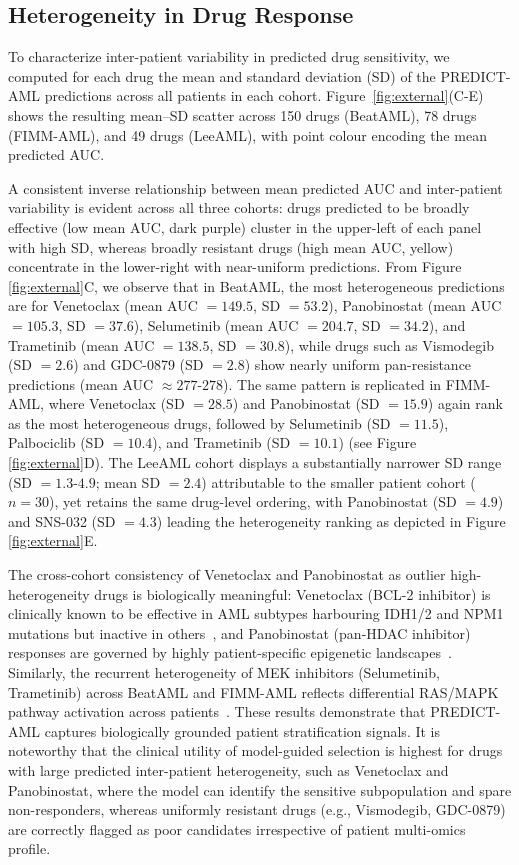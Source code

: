 \documentclass[pdflatex,sn-mathphys-num]{sn-jnl}
\theoremstyle{thmstyleone}
\theoremstyle{thmstyletwo}
\theoremstyle{thmstylethree}
\begin{document}
\subsection{Heterogeneity in Drug Response}\label{sec3.7}
To characterize inter-patient variability in predicted drug sensitivity, we computed for each drug the mean and standard deviation (SD) of the PREDICT-AML predictions across all patients in each cohort. Figure~\ref{fig:external}(C-E) shows the resulting mean–SD scatter across 150 drugs (BeatAML), 78 drugs (FIMM-AML), and 49 drugs (LeeAML), with point colour encoding the mean predicted AUC.

A consistent inverse relationship between mean predicted AUC and inter-patient variability is evident across all three cohorts: drugs predicted to be broadly effective (low mean AUC, dark purple) cluster in the upper-left of each panel with high SD, whereas broadly resistant drugs (high mean AUC, yellow) concentrate in the lower-right with near-uniform predictions. From Figure \ref{fig:external}C, we observe that in BeatAML, the most heterogeneous predictions are for Venetoclax (mean AUC $= 149.5$, SD $= 53.2$), Panobinostat (mean AUC $= 105.3$, SD $= 37.6$), Selumetinib (mean AUC $= 204.7$, SD $= 34.2$), and Trametinib (mean AUC $= 138.5$, SD $= 30.8$), while drugs such as Vismodegib (SD $= 2.6$) and GDC-0879 (SD $= 2.8$) show nearly uniform pan-resistance predictions (mean AUC $\approx 277$-$278$). The same pattern is replicated in FIMM-AML, where Venetoclax (SD $= 28.5$) and Panobinostat (SD $= 15.9$) again rank as the most heterogeneous drugs, followed by Selumetinib (SD $= 11.5$), Palbociclib (SD $= 10.4$), and Trametinib (SD $= 10.1$) (see Figure \ref{fig:external}D). The LeeAML cohort displays a substantially narrower SD range (SD $= 1.3$-$4.9$; mean SD $= 2.4$) attributable to the smaller patient cohort ($n = 30$), yet retains the same drug-level ordering, with Panobinostat (SD $= 4.9$) and SNS-032 (SD $= 4.3$) leading the heterogeneity ranking as depicted in Figure \ref{fig:external}E. 

The cross-cohort consistency of Venetoclax and Panobinostat as outlier high-heterogeneity drugs is biologically meaningful: Venetoclax (BCL-2 inhibitor) is clinically known to be effective in AML subtypes harbouring IDH1/2 and NPM1 mutations but inactive in others~\cite{bisaillon2020genetic, diamantidis2025factors, zhang2020integrated}, and Panobinostat (pan-HDAC inhibitor) responses are governed by highly patient-specific epigenetic landscapes~\cite{babu2021jak, tang2025epigenetic, kuhn2025epigenetic}. Similarly, the recurrent heterogeneity of MEK inhibitors (Selumetinib, Trametinib) across BeatAML and FIMM-AML reflects differential RAS/MAPK pathway activation across patients~\cite{modak2024targeting, chen2025ras}. These results demonstrate that PREDICT-AML captures biologically grounded patient stratification signals. It is noteworthy that the clinical utility of model-guided selection is highest for drugs with large predicted inter-patient heterogeneity, such as Venetoclax and Panobinostat, where the model can identify the sensitive subpopulation and spare non-responders, whereas uniformly resistant drugs (e.g., Vismodegib, GDC-0879) are correctly flagged as poor candidates irrespective of patient multi-omics profile.
\end{document}
